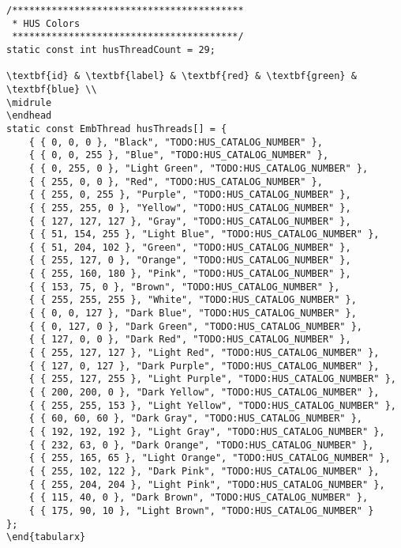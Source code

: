 \documentclass[onesize, a4paper]{refart}
\begin{document}
\begin{verbatim}
/*****************************************
 * HUS Colors
 ****************************************/
static const int husThreadCount = 29;

\textbf{id} & \textbf{label} & \textbf{red} & \textbf{green} & \textbf{blue} \\
\midrule
\endhead
static const EmbThread husThreads[] = {
    { { 0, 0, 0 }, "Black", "TODO:HUS_CATALOG_NUMBER" },
    { { 0, 0, 255 }, "Blue", "TODO:HUS_CATALOG_NUMBER" },
    { { 0, 255, 0 }, "Light Green", "TODO:HUS_CATALOG_NUMBER" },
    { { 255, 0, 0 }, "Red", "TODO:HUS_CATALOG_NUMBER" },
    { { 255, 0, 255 }, "Purple", "TODO:HUS_CATALOG_NUMBER" },
    { { 255, 255, 0 }, "Yellow", "TODO:HUS_CATALOG_NUMBER" },
    { { 127, 127, 127 }, "Gray", "TODO:HUS_CATALOG_NUMBER" },
    { { 51, 154, 255 }, "Light Blue", "TODO:HUS_CATALOG_NUMBER" },
    { { 51, 204, 102 }, "Green", "TODO:HUS_CATALOG_NUMBER" },
    { { 255, 127, 0 }, "Orange", "TODO:HUS_CATALOG_NUMBER" },
    { { 255, 160, 180 }, "Pink", "TODO:HUS_CATALOG_NUMBER" },
    { { 153, 75, 0 }, "Brown", "TODO:HUS_CATALOG_NUMBER" },
    { { 255, 255, 255 }, "White", "TODO:HUS_CATALOG_NUMBER" },
    { { 0, 0, 127 }, "Dark Blue", "TODO:HUS_CATALOG_NUMBER" },
    { { 0, 127, 0 }, "Dark Green", "TODO:HUS_CATALOG_NUMBER" },
    { { 127, 0, 0 }, "Dark Red", "TODO:HUS_CATALOG_NUMBER" },
    { { 255, 127, 127 }, "Light Red", "TODO:HUS_CATALOG_NUMBER" },
    { { 127, 0, 127 }, "Dark Purple", "TODO:HUS_CATALOG_NUMBER" },
    { { 255, 127, 255 }, "Light Purple", "TODO:HUS_CATALOG_NUMBER" },
    { { 200, 200, 0 }, "Dark Yellow", "TODO:HUS_CATALOG_NUMBER" },
    { { 255, 255, 153 }, "Light Yellow", "TODO:HUS_CATALOG_NUMBER" },
    { { 60, 60, 60 }, "Dark Gray", "TODO:HUS_CATALOG_NUMBER" },
    { { 192, 192, 192 }, "Light Gray", "TODO:HUS_CATALOG_NUMBER" },
    { { 232, 63, 0 }, "Dark Orange", "TODO:HUS_CATALOG_NUMBER" },
    { { 255, 165, 65 }, "Light Orange", "TODO:HUS_CATALOG_NUMBER" },
    { { 255, 102, 122 }, "Dark Pink", "TODO:HUS_CATALOG_NUMBER" },
    { { 255, 204, 204 }, "Light Pink", "TODO:HUS_CATALOG_NUMBER" },
    { { 115, 40, 0 }, "Dark Brown", "TODO:HUS_CATALOG_NUMBER" },
    { { 175, 90, 10 }, "Light Brown", "TODO:HUS_CATALOG_NUMBER" }
};
\end{tabularx}



\end{verbatim}
\end{document}
